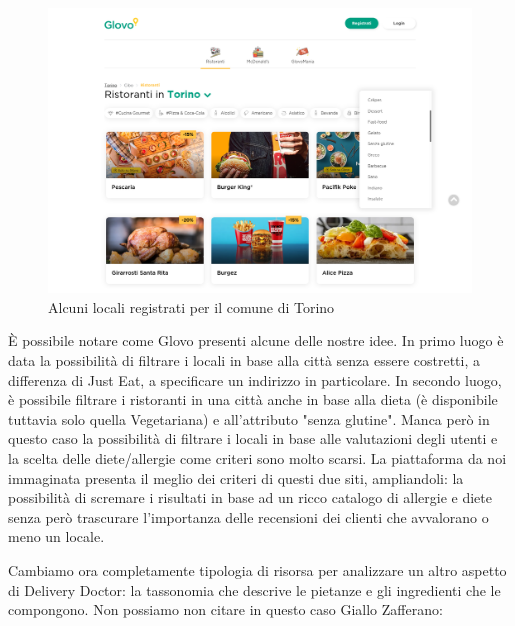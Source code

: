 \documentclass[12pt]{article}
\begin{document}
\begin{figure}[H]
    \centering
    \includegraphics[width=12cm]{files/glovo.png}
    \caption{Alcuni locali registrati per il comune di Torino}
\end{figure}
\`{E} possibile notare come Glovo presenti alcune delle nostre idee.\newline
In primo luogo è data la possibilità di filtrare i locali in base alla città senza essere costretti, a differenza di Just Eat, a specificare un indirizzo in particolare. In secondo luogo, è possibile filtrare i ristoranti in una città anche in base alla dieta (è disponibile tuttavia solo quella Vegetariana) e all'attributo "senza glutine". Manca però in questo caso la possibilità di filtrare i locali in base alle valutazioni degli utenti e la scelta delle diete/allergie come criteri sono molto scarsi. \newline
La piattaforma da noi immaginata presenta il meglio dei criteri di questi due siti, ampliandoli: la possibilità di scremare i risultati in base ad un ricco catalogo di allergie e diete senza però trascurare l'importanza delle recensioni dei clienti che avvalorano o meno un locale.
\par 
Cambiamo ora completamente tipologia di risorsa per analizzare un altro aspetto di Delivery Doctor: la tassonomia che descrive le pietanze e gli ingredienti che le compongono. Non possiamo non citare in questo caso Giallo Zafferano:
\end{document}
